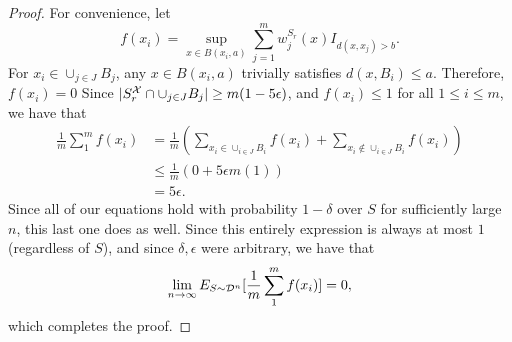 \begin{proof}
For convenience, let $$f(x_i) =\sup_{x \in B(x_i, a)}\sum_{j=1}^m w_j^{S_r}(x)I_{d(x, x_j) > b}.$$ For $x_i \in \cup_{j \in J} B_j$, any $x \in B(x_i,a)$ trivially satisfies $d(x, B_i) \leq a$. Therefore, $f(x_i) = 0$ Since $|S_r^\mathcal X \cap \cup_{j \in J} B_j| \geq m(1-5\epsilon)$, and $f(x_i) \leq 1$ for all $1 \leq i \leq m$, we have that 
\begin{equation*}
\begin{split}
\frac{1}{m}\sum_1^m f(x_i) &= \frac{1}{m}(\sum_{x_i \in \cup_{i \in J} B_i} f(x_i) + \sum_{x_i \notin \cup_{i \in J}B_i} f(x_i))\\
&\leq  \frac{1}{m}(0 + 5\epsilon m (1)) \\
&= 5\epsilon.
\end{split}
\end{equation*}
Since all of our equations hold with probability $1-\delta$ over $S$ for sufficiently large $n$, this last one does as well. Since this entirely expression is always at most $1$ (regardless of $S$), and  since $\delta, \epsilon$ were arbitrary, we have that $$\lim_{n \to \infty} E_{S \sim {\mathcal D}^n}[\frac{1}{m}\sum_1^m f(x_i)] = 0,$$ which completes the proof.  
\end{proof}

